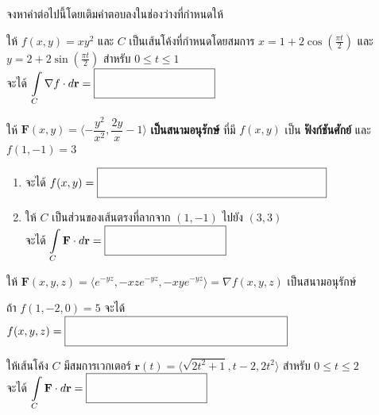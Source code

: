 \documentclass[12pt,final]{novelette} %
\begin{document}
\begin{question}
    \pagebreak

    \item {} %
     จงหาค่าต่อไปนี้โดยเติมคำตอบลงในช่องว่างที่กำหนดให้
    \begin{question}
        \item {} ให้ $f(x, y) = xy^2$ และ $C$ เป็นเส้นโค้งที่กำหนดโดยสมการ $x = 1 + 2 \cos(\frac{\pi t}{2})$
        และ $y = 2 + 2 \sin(\frac{\pi t}{2})$ สำหรับ $0 \leq t \leq 1$ \\[.5em]
        จะได้ $\displaystyle \int\limits_C \nabla f \cdot d\mathbf{r} = \ansboxi{3.6cm}$

        \vspace{3.8em}

        \item ให้ $\mathbf{F}(x, y) = \langle -\dfrac{y^2}{x^2}, \dfrac{2y}{x} - 1 \rangle$ \textbf{เป็นสนามอนุรักษ์}
        ที่มี $f(x, y)$ เป็น \textbf{ฟังก์ชันศักย์} และ $f(1, -1) = 3$
        \begin{enumerate}[label=(\alph*),itemsep=12pt,topsep=25pt]
            \item {} จะได้ $f(x, y) = \ansboxi{7cm}$

                  \vspace{4.2em}
            \item {} ให้ $C$ เป็นส่วนของเส้นตรงที่ลากจาก $(1, -1)$ ไปยัง $(3, 3)$ \\[.5em]
                  จะได้ $\displaystyle \int\limits_C \mathbf{F} \cdot d\mathbf{r} = \ansboxi{3.6cm}$
        \end{enumerate}
    \end{question}

    \vspace{3.1em}

    \item {} %
     ให้ $\mathbf{F}(x, y, z) = \langle e^{-yz}, -xz e^{-yz}, -xy e^{-yz} \rangle = \nabla f(x, y, z)$ เป็นสนามอนุรักษ์
    \begin{question}
        \item {} ถ้า $f(1, -2, 0) = 5$ จะได้ $f(x, y, z) = \ansboxi{6.8cm}$

        \vspace{3.8em}
        \item {} ให้เส้นโค้ง $C$ มีสมการเวกเตอร์ $\mathbf{r}(t) = \langle \sqrt{2t^2 + 1}, t - 2, 2t^2 \rangle$ สำหรับ $0 \leq t \leq 2$ \\[.5em]
        จะได้ $\displaystyle \int\limits_C \mathbf{F} \cdot d\mathbf{r} = \ansboxi{3.6cm}$
    \end{question}


\end{question}
\end{document}
